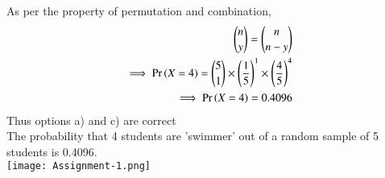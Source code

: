 \documentclass[journal,12pt,twocolumn]{IEEEtran}
\begin{document}
As per the property of permutation and combination,
\begin{align}
{{n}\choose{y}}={{n}\choose{n-y}}\\
\implies\Pr\left(X = 4\right)={{5}\choose{1}} \times\left(\frac{1}{5}\right)^{1} \times \left(\frac{4}{5}\right)^{4}\\\notag
\implies \Pr\left(X = 4\right) = 0.4096\notag
\end{align}
Thus options a) and c) are correct\\
The probability that 4 students are 'swimmer' out of a random sample of 5 students is 0.4096.\\
\pagebreak
\texttt{[image: Assignment-1.png]}
\end{document}
